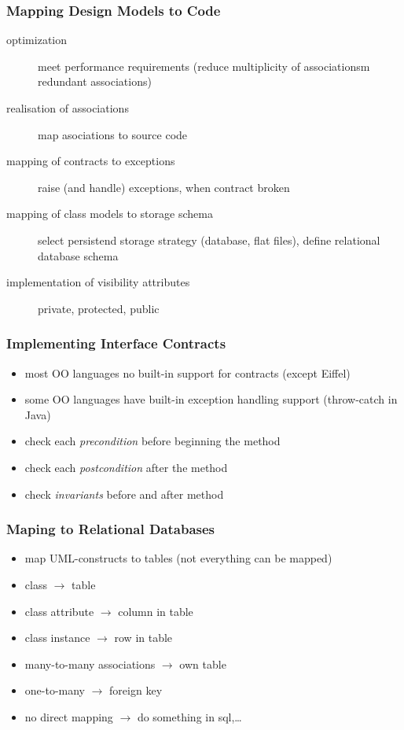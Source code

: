 \documentclass[a4paper, 10pt]{article}
\begin{document}
\subsubsection{Mapping Design Models to Code}
\begin{description}
	\item[optimization] meet performance requirements (reduce multiplicity of associationsm redundant associations)
	\item[realisation of associations] map asociations to source code
	\item[mapping of contracts to exceptions] raise (and handle) exceptions, when contract broken
	\item[mapping of class models to storage schema] select persistend storage strategy (database, flat files), define relational database schema
	\item[implementation of visibility attributes] private, protected, public
\end{description}

\subsubsection{Implementing Interface Contracts}
\begin{itemize}
	\item most OO languages no built-in support for contracts (except Eiffel)
	\item some OO languages have built-in exception handling support (throw-catch in Java)
	\item check each \emph{precondition} before beginning the method
	\item check each \emph{postcondition} after the method
	\item check \emph{invariants} before and after method
\end{itemize}

\subsubsection{Maping to Relational Databases}
\begin{itemize}
	\item map UML-constructs to tables (not everything can be mapped)
	\item class $\to$ table
	\item class attribute $\to$ column in table
	\item class instance $\to$ row in table
	\item many-to-many associations $\to$ own table
	\item one-to-many $\to$ foreign key
	\item no direct mapping $\to$ do something in sql,\dots
\end{itemize}
\end{document}
